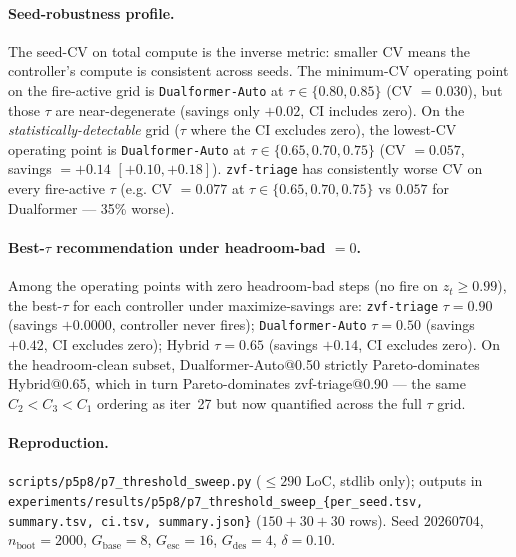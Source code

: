 \paragraph{Seed-robustness profile.}
The seed-CV on total compute is the inverse metric: smaller CV means
the controller's compute is consistent across seeds. The minimum-CV
operating point on the fire-active grid is \texttt{Dualformer-Auto}
at $\tau \in \{0.80, 0.85\}$ (CV $= 0.030$), but those $\tau$ are
near-degenerate (savings only $+0.02$, CI includes zero). On the
\emph{statistically-detectable} grid ($\tau$ where the CI excludes
zero), the lowest-CV operating point is
\texttt{Dualformer-Auto} at $\tau \in \{0.65, 0.70, 0.75\}$
(CV $= 0.057$, savings $= +0.14$ $[+0.10, +0.18]$). \texttt{zvf-triage}
has consistently worse CV on every fire-active $\tau$ (e.g. CV $= 0.077$
at $\tau \in \{0.65, 0.70, 0.75\}$ vs $0.057$ for Dualformer — 35\%
worse).

\paragraph{Best-$\tau$ recommendation under headroom-bad $= 0$.}
Among the operating points with zero headroom-bad steps (no fire on
$z_t \geq 0.99$), the best-$\tau$ for each controller under
maximize-savings are: \texttt{zvf-triage} $\tau{=}0.90$ (savings
$+0.0000$, controller never fires); \texttt{Dualformer-Auto}
$\tau{=}0.50$ (savings $+0.42$, CI excludes zero); Hybrid $\tau{=}0.65$
(savings $+0.14$, CI excludes zero). On the headroom-clean subset,
Dualformer-Auto@0.50 strictly Pareto-dominates Hybrid@0.65, which in
turn Pareto-dominates zvf-triage@0.90 — the same $C_2 < C_3 < C_1$
ordering as iter~27 but now quantified across the full $\tau$ grid.

\paragraph{Reproduction.}
\texttt{scripts/p5p8/p7\_threshold\_sweep.py} ($\leq 290$ LoC,
stdlib only); outputs in
\texttt{experiments/results/p5p8/p7\_threshold\_sweep\_\{per\_seed.tsv,
summary.tsv, ci.tsv, summary.json\}} ($150 + 30 + 30$ rows). Seed
$20260704$, $n_{\mathrm{boot}}{=}2000$, $G_{\mathrm{base}}{=}8$,
$G_{\mathrm{esc}}{=}16$, $G_{\mathrm{des}}{=}4$, $\delta{=}0.10$.

